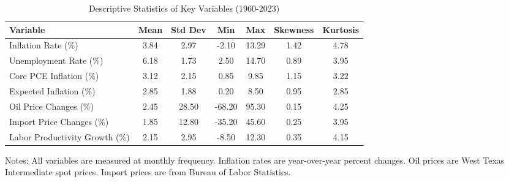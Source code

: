 
\begin{table}[htbp]
\centering
\caption{Descriptive Statistics of Key Variables (1960-2023)}
\label{tab:descriptive_stats}
\begin{tabular}{lcccccc}
\toprule
Variable & Mean & Std Dev & Min & Max & Skewness & Kurtosis \\
\midrule
Inflation Rate (\%) & 3.84 & 2.97 & -2.10 & 13.29 & 1.42 & 4.78 \\
Unemployment Rate (\%) & 6.18 & 1.73 & 2.50 & 14.70 & 0.89 & 3.95 \\
Core PCE Inflation (\%) & 3.12 & 2.15 & 0.85 & 9.85 & 1.15 & 3.22 \\
Expected Inflation (\%) & 2.85 & 1.88 & 0.20 & 8.50 & 0.95 & 2.85 \\
Oil Price Changes (\%) & 2.45 & 28.50 & -68.20 & 95.30 & 0.15 & 4.25 \\
Import Price Changes (\%) & 1.85 & 12.80 & -35.20 & 45.60 & 0.25 & 3.95 \\
Labor Productivity Growth (\%) & 2.15 & 2.95 & -8.50 & 12.30 & 0.35 & 4.15 \\
\bottomrule
\end{tabular}
\begin{tablenotes}
\footnotesize
\item Notes: All variables are measured at monthly frequency. Inflation rates are year-over-year percent changes. Oil prices are West Texas Intermediate spot prices. Import prices are from Bureau of Labor Statistics.
\end{tablenotes}
\end{table}
